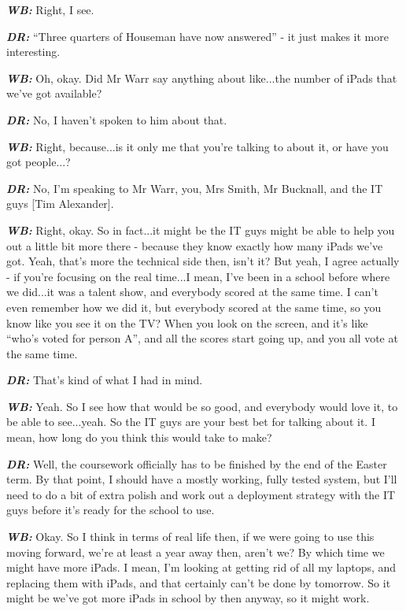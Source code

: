 \textit{\textbf{WB:}} Right, I see.

\textit{\textbf{DR:}} ``Three quarters of Houseman have now answered'' - it just makes it more interesting.

\textit{\textbf{WB:}} Oh, okay. Did Mr Warr say anything about like...the number of iPads that we've got available?

\textit{\textbf{DR:}} No, I haven't spoken to him about that.

\textit{\textbf{WB:}} Right, because...is it only me that you're talking to about it, or have you got people...?

\textit{\textbf{DR:}} No, I'm speaking to Mr Warr, you, Mrs Smith, Mr Bucknall, and the IT guys [Tim Alexander].

\textit{\textbf{WB:}} Right, okay. So in fact...it might be the IT guys might be able to help you out a little bit more there - because they know exactly how many iPads we've got. Yeah, that's more the technical side then, isn't it? But yeah, I agree actually - if you're focusing on the real time...I mean, I've been in a school before where we did...it was a talent show, and everybody scored at the same time. I can't even remember how we did it, but everybody scored at the same time, so you know like you see it on the TV? When you look on the screen, and it's like ``who's voted for person A'', and all the scores start going up, and you all vote at the same time.

\textit{\textbf{DR:}} That's kind of what I had in mind.

\textit{\textbf{WB:}} Yeah. So I see how that would be so good, and everybody would love it, to be able to see...yeah. So the IT guys are your best bet for talking about it. I mean, how long do you think this would take to make?

\textit{\textbf{DR:}} Well, the coursework officially has to be finished by the end of the Easter term. By that point, I should have a mostly working, fully tested system, but I'll need to do a bit of extra polish and work out a deployment strategy with the IT guys before it's ready for the school to use.

\textit{\textbf{WB:}} Okay. So I think in terms of real life then, if we were going to use this moving forward, we're at least a year away then, aren't we? By which time we might have more iPads. I mean, I'm looking at getting rid of all my laptops, and replacing them with iPads, and that certainly can't be done by tomorrow. So it might be we've got more iPads in school by then anyway, so it might work.

